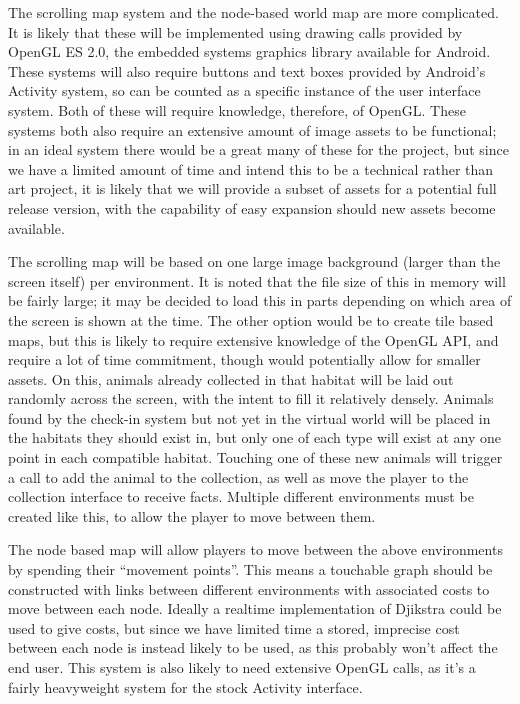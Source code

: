\documentclass[]{report}
\begin{document}
The scrolling map system and the node-based world map are more complicated. It is likely that these will be implemented using drawing calls provided by OpenGL ES 2.0, the embedded systems graphics library available for Android. These systems will also require buttons and text boxes provided by Android's Activity system, so can be counted as a specific instance of the user interface system. Both of these will require knowledge, therefore, of OpenGL. These systems both also require an extensive amount of image assets to be functional; in an ideal system there would be a great many of these for the project, but since we have a limited amount of time and intend this to be a technical rather than art project, it is likely that we will provide a subset of assets for a potential full release version, with the capability of easy expansion should new assets become available.

The scrolling map will be based on one large image background (larger than the screen itself) per environment. It is noted that the file size of this in memory will be fairly large; it may be decided to load this in parts depending on which area of the screen is shown at the time. The other option would be to create tile based maps, but this is likely to require extensive knowledge of the OpenGL API, and require a lot of time commitment, though would potentially allow for smaller assets. On this, animals already collected in that habitat will be laid out randomly across the screen, with the intent to fill it relatively densely. Animals found by the check-in system but not yet in the virtual world will be placed in the habitats they should exist in, but only one of each type will exist at any one point in each compatible habitat. Touching one of these new animals will trigger a call to add the animal to the collection, as well as move the player to the collection interface to receive facts. Multiple different environments must be created like this, to allow the player to move between them.

The node based map will allow players to move between the above environments by spending their ``movement points''. This means a touchable graph should be constructed with links between different environments with associated costs to move between each node. Ideally a realtime implementation of Djikstra could be used to give costs, but since we have limited time a stored, imprecise cost between each node is instead likely to be used, as this probably won't affect the end user. This system is also likely to need extensive OpenGL calls, as it's a fairly heavyweight system for the stock Activity interface.
\end{document}
